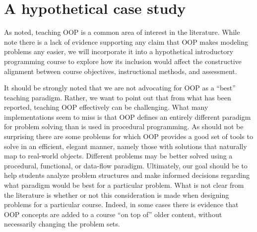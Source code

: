\documentclass[12pt]{article}
\begin{document}
\section*{A hypothetical case study}
As noted, teaching OOP is a common area of interest in the
literature. While \citeauthor{robins_learning_2003} note there is a
lack of evidence supporting any claim that OOP makes modeling problems
any easier\autocite{robins_learning_2003}, we will incorporate it into
a hypothetical introductory programming course to explore how its
inclusion would affect the constructive alignment between course
objectives, instructional methods, and assessment.

It should be strongly noted that we are not advocating for OOP as a
``best'' teaching paradigm. Rather, we want to point out that from
what has been reported, teaching OOP effectively can be
challenging. What many implementations seem to miss is that OOP
defines an entirely different paradigm for problem solving than is
used in procedural programming\autocite{kolling_problem_1999}. As
should not be surprising there are some problems for which OOP
provides a good set of tools to solve in an efficient, elegant manner,
namely those with solutions that naturally map to real-world
objects\autocite{raymond_art_2003}. Different problems may be better
solved using a procedural, functional, or data-flow
paradigm\autocite{kay_history_1996,felleisen_functional_2009,crestani_experience_2010}. Ultimately,
our goal should be to help students analyze problem structures and
make informed decisions regarding what paradigm would be best for a
particular problem. What is not clear from the literature is whether
or not this consideration is made when designing problems for a
particular course. Indeed, in some cases there is evidence that OOP
concepts are added to a course ``on top of'' older content, without
necessarily changing the problem
sets\autocite{kolling_problem_1999,vilner_fundamental_2007}.
\end{document}
